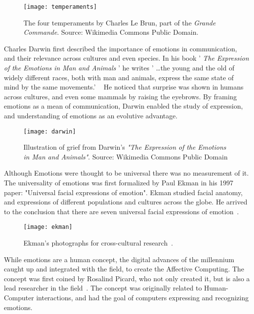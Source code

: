 \begin{figure}[H]
  \texttt{[image: temperaments]}
  \centering
  \caption{The four temperaments by Charles Le Brun, part of the \emph{Grande Commande}. Source: Wikimedia Commons Public Domain.}\label{fig:temperaments}
\end{figure}

Charles Darwin first described the importance of emotions in communication, and their relevance across cultures and even species. In his book ' \emph{The Expression of the Emotions in Man and Animals} ' he writes ' \ldots the young and the old of widely different races, both with man and animals, express the same state of mind by the same movements.' ~\cite{darwin1872emotions} He noticed that surprise was shown in humans across cultures, and even some mammals by raising the eyebrows. By framing emotions as a mean of communication, Darwin enabled the study of expression, and understanding of emotions as an evolutive advantage.

\begin{figure}[H]
  \texttt{[image: darwin]}
  \centering
  \caption{Illustration of grief from Darwin's \emph{"The Expression of the Emotions in Man and Animals"}. Source: Wikimedia Commons Public Domain}\label{fig:darwin}
\end{figure}

Although Emotions were thought to be universal there was no measurement of it. The universality of emotions was first formalized by Paul Ekman in his 1997 paper: "Universal facial expressions of emotion". Ekman studied facial anatomy, and expressions of different populations and cultures across the globe. He arrived to the conclusion that there are seven universal facial expressions of emotion~\cite{ekman1997universal}.

\begin{figure}[H]
  \texttt{[image: ekman]}
  \centering
  \caption{Ekman's photographs for cross-cultural research~\cite{ekman1999facial}.}\label{fig:ekman}
\end{figure}

While emotions are a human concept, the digital advances of the millennium caught up and integrated with the field, to create the Affective Computing. The concept was first coined by Rosalind Picard, who not only created it, but is also a lead researcher in the field~\cite{picard2000affective}. The concept was originally related to Human-Computer interactions, and had the goal of computers expressing and recognizing emotions.

